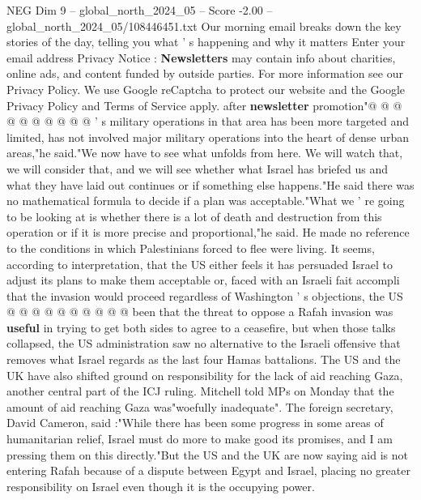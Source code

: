 \begin{textsample}{NEG Dim 9 – global\_north\_2024\_05 – Score -2.00 – global\_north\_2024\_05/108446451.txt}
Our morning email breaks down the key stories of the day, telling you what ' s happening and why it matters Enter your email address Privacy Notice : \textbf{Newsletters} may contain info about charities, online ads, and content funded by outside parties.
For more information see our Privacy Policy.
We use Google reCaptcha to protect our website and the Google Privacy Policy and Terms of Service apply. after \textbf{newsletter} promotion"@ @ @ @ @ @ @ @ @ @ ' s military operations in that area has been more targeted and limited, has not involved major military operations into the heart of dense urban areas,"he said."We now have to see what unfolds from here.
We will watch that, we will consider that, and we will see whether what Israel has briefed us and what they have laid out continues or if something else happens."He said there was no mathematical formula to decide if a plan was acceptable."What we ' re going to be looking at is whether there is a lot of death and destruction from this operation or if it is more precise and proportional,"he said.
He made no reference to the conditions in which Palestinians forced to flee were living.
It seems, according to interpretation, that the US either feels it has persuaded Israel to adjust its plans to make them acceptable or, faced with an Israeli fait accompli that the invasion would proceed regardless of Washington ' s objections, the US @ @ @ @ @ @ @ @ @ @ been that the threat to oppose a Rafah invasion was \textbf{useful} in trying to get both sides to agree to a ceasefire, but when those talks collapsed, the US administration saw no alternative to the Israeli offensive that removes what Israel regards as the last four Hamas battalions.
The US and the UK have also shifted ground on responsibility for the lack of aid reaching Gaza, another central part of the ICJ ruling.
Mitchell told MPs on Monday that the amount of aid reaching Gaza was"woefully inadequate".
The foreign secretary, David Cameron, said :"While there has been some progress in some areas of humanitarian relief, Israel must do more to make good its promises, and I am pressing them on this directly."But the US and the UK are now saying aid is not entering Rafah because of a dispute between Egypt and Israel, placing no greater responsibility on Israel even though it is the occupying power.

\end{textsample}
